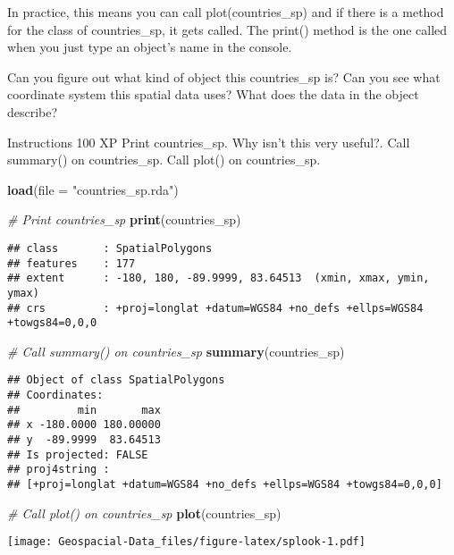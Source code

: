 \documentclass[]{article}
\newenvironment{Shaded}{\begin{snugshade}}{\end{snugshade}}
\newcommand{\CommentTok}[1]{\textcolor[rgb]{0.56,0.35,0.01}{\textit{#1}}}
\newcommand{\DataTypeTok}[1]{\textcolor[rgb]{0.13,0.29,0.53}{#1}}
\newcommand{\KeywordTok}[1]{\textcolor[rgb]{0.13,0.29,0.53}{\textbf{#1}}}
\newcommand{\NormalTok}[1]{#1}
\newcommand{\StringTok}[1]{\textcolor[rgb]{0.31,0.60,0.02}{#1}}
\begin{document}
In practice, this means you can call plot(countries\_sp) and if there is
a method for the class of countries\_sp, it gets called. The print()
method is the one called when you just type an object's name in the
console.

Can you figure out what kind of object this countries\_sp is? Can you
see what coordinate system this spatial data uses? What does the data in
the object describe?

Instructions 100 XP Print countries\_sp. Why isn't this very useful?.
Call summary() on countries\_sp. Call plot() on countries\_sp.

\begin{Shaded}
\begin{Highlighting}[]
\KeywordTok{load}\NormalTok{(}\DataTypeTok{file =} \StringTok{"countries_sp.rda"}\NormalTok{)}

\CommentTok{# Print countries_sp}
\KeywordTok{print}\NormalTok{(countries_sp)}
\end{Highlighting}
\end{Shaded}

\begin{verbatim}
## class       : SpatialPolygons 
## features    : 177 
## extent      : -180, 180, -89.9999, 83.64513  (xmin, xmax, ymin, ymax)
## crs         : +proj=longlat +datum=WGS84 +no_defs +ellps=WGS84 +towgs84=0,0,0
\end{verbatim}

\begin{Shaded}
\begin{Highlighting}[]
\CommentTok{# Call summary() on countries_sp}
\KeywordTok{summary}\NormalTok{(countries_sp)}
\end{Highlighting}
\end{Shaded}

\begin{verbatim}
## Object of class SpatialPolygons
## Coordinates:
##         min       max
## x -180.0000 180.00000
## y  -89.9999  83.64513
## Is projected: FALSE 
## proj4string :
## [+proj=longlat +datum=WGS84 +no_defs +ellps=WGS84 +towgs84=0,0,0]
\end{verbatim}

\begin{Shaded}
\begin{Highlighting}[]
\CommentTok{# Call plot() on countries_sp}
\KeywordTok{plot}\NormalTok{(countries_sp)}
\end{Highlighting}
\end{Shaded}

\texttt{[image: Geospacial-Data\_files/figure-latex/splook-1.pdf]}
\end{document}

